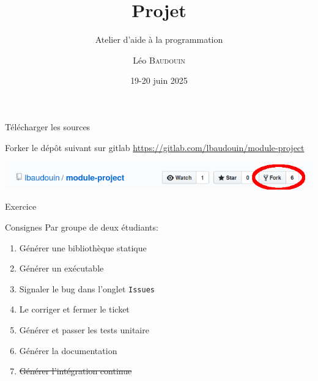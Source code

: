 \documentclass{beamer}
\title{Projet}
\subtitle{Atelier d'aide à la programmation}
\author{L\'eo \textsc{Baudouin}}
\institute{
  {\url{baudouin.leo @ gmail.com}}
}
\date{19-20 juin 2025}
\begin{document}
\begin{frame}
  \titlepage
\end{frame}


\section{}
\subsection{}

\begin{frame}[fragile]{Télécharger les sources}
  \begin{block}{Forker le dép\^ot suivant sur gitlab}
    \url{https://gitlab.com/lbaudouin/module-project}
  \end{block}
  
\includegraphics[width=\linewidth]{images/fork.png}  
  
\end{frame}

\begin{frame}[fragile]{Exercice}  
    \begin{exampleblock}{Consignes}
	Par groupe de deux étudiants:
    \begin{enumerate}
    \item Générer une bibliothèque statique
    \item Générer un exécutable
    \item Signaler le bug dans l'onglet \verb?Issues?
    \item Le corriger et fermer le ticket
    \item Générer et passer les tests unitaire
    \item Générer la documentation
    \item \sout{Générer l'intégration continue}
    \end{enumerate}
  \end{exampleblock}
\end{frame}

\end{document}
